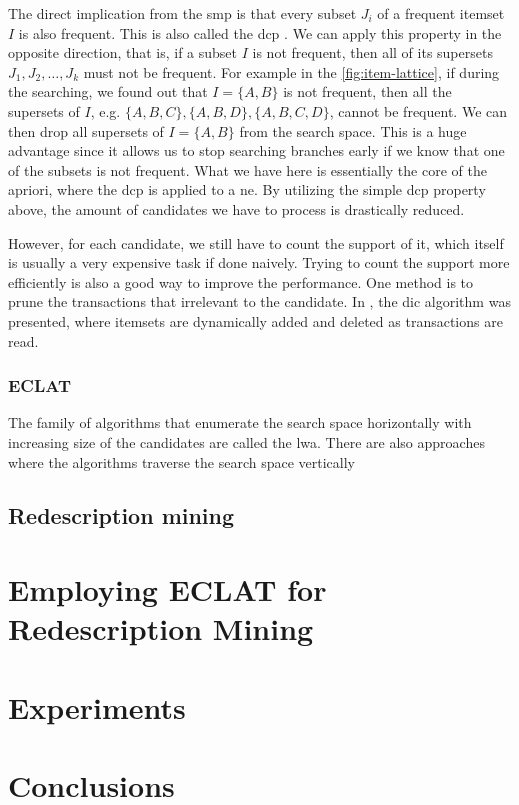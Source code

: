 The direct implication from the \acl{smp} is that every subset $J_i$ of a frequent itemset $I$ is also frequent.
This is also called the \acl{dcp} \citep{Aggarwal15}.
We can apply this property in the opposite direction, that is, if a subset $I$ is not frequent, then all of its supersets $J_1, J_2, \dots, J_k$ must not be frequent.
For example in the \autoref{fig:item-lattice}, if during the searching, we found out that $I = \{A, B\}$ is not frequent, then all the supersets of $I$, e.g. $\{A, B, C\}, \{A, B , D\}, \{A, B , C, D\}$, cannot be frequent.
We can then drop all supersets of ${I = \{A, B\}}$ from the search space.
This is a huge advantage since it allows us to stop searching branches early if we know that one of the subsets is not frequent.
What we have here is essentially the core of the \acl{apriori}, where the \acl{dcp} is applied to a \ac{ne}.
By utilizing the simple \acl{dcp} property above, the amount of candidates we have to process is drastically reduced.

However, for each candidate, we still have to count the support of it, which itself is usually a very expensive task if done naively.
Trying to count the support more efficiently is also a good way to improve the performance.
One method is to prune the transactions that irrelevant to the candidate.
In \citep{brin_et_al_1997}, the \ac{dic} algorithm was presented, where itemsets are dynamically added and deleted as transactions are read.



\subsection{ECLAT}
The family of algorithms that enumerate the search space horizontally with increasing size of the candidates are called the \acl{lwa}.
There are also approaches where the algorithms traverse the search space vertically

\section{Redescription mining}


\chapter{Employing ECLAT for Redescription Mining}
\label{cha:employment}

\chapter{Experiments}
\label{cha:experiments}

\chapter{Conclusions}
\label{cha:conclusions}